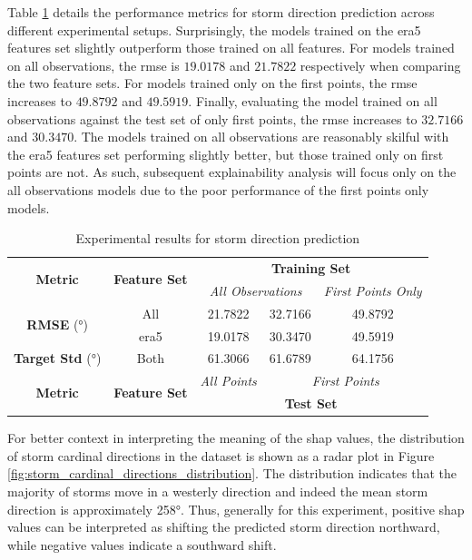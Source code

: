 Table \ref{tab:storm_direction_results} details the performance metrics for storm direction prediction across different experimental setups. Surprisingly, the models trained on the \acrshort{era5} features set slightly outperform those trained on all features. For models trained on all observations, the \acrshort{rmse} is $19.0178$ and $21.7822$ respectively when comparing the two feature sets. For models trained only on the first points, the \acrshort{rmse} increases to $49.8792$ and $49.5919$. Finally, evaluating the model trained on all observations against the test set of only first points, the \acrshort{rmse} increases to $32.7166$ and $30.3470$. The models trained on all observations are reasonably skilful with the \acrshort{era5} features set performing slightly better, but those trained only on first points are not. As such, subsequent explainability analysis will focus only on the all observations models due to the poor performance of the first points only models.

\begin{table}[ht]
\centering
\caption{Experimental results for storm direction prediction}
\label{tab:storm_direction_results}
\begin{tabular}{|c|c|c|c|c|}
\hline
\multirow{2}{*}{\textbf{Metric}} & \multirow{2}{*}{\textbf{Feature Set}} & \multicolumn{3}{c|}{\textbf{Training Set} } \\ \cline{3-5}
 & & \multicolumn{2}{c|}{\textit{All Observations}} & \textit{First Points Only} \\
\hline \hline
\multirow{2}{*}{\textbf{RMSE} (\unit{\degree})} & All & 21.7822 & 32.7166 & 49.8792 \\
 & \acrshort{era5} & 19.0178 & 30.3470 & 49.5919 \\
\hline
\textbf{Target Std} (\unit{\degree}) & Both & 61.3066 & 61.6789 & 64.1756 \\
\hline \hline
\multirow{2}{*}{\textbf{Metric}} & \multirow{2}{*}{\textbf{Feature Set}} & \textit{All Points} & \multicolumn{2}{c|}{\textit{First Points}} \\ \cline{3-5}
 & & \multicolumn{3}{c|}{\textbf{Test Set}} \\ 
\hline
\end{tabular}
\end{table}

For better context in interpreting the meaning of the \acrshort{shap} values, the distribution of storm cardinal directions in the dataset is shown as a radar plot in Figure \ref{fig:storm_cardinal_directions_distribution}. The distribution indicates that the majority of storms move in a westerly direction and indeed the mean storm direction is approximately \ang{258}. Thus, generally for this experiment, positive \acrshort{shap} values can be interpreted as shifting the predicted storm direction northward, while negative values indicate a southward shift.

